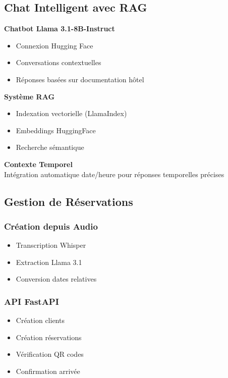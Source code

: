 \documentclass[12pt,a4paper]{article}
\newenvironment{block}[1]{\begin{center}\begin{minipage}{0.9\textwidth}\textbf{#1}\\}{\end{minipage}\end{center}}
\begin{document}
\subsection{Chat Intelligent avec RAG}

\begin{block}{Chatbot Llama 3.1-8B-Instruct}
\begin{itemize}
    \item Connexion Hugging Face
    \item Conversations contextuelles
    \item Réponses basées sur documentation hôtel
\end{itemize}
\end{block}

\begin{block}{Système RAG}
\begin{itemize}
    \item Indexation vectorielle (LlamaIndex)
    \item Embeddings HuggingFace
    \item Recherche sémantique
\end{itemize}
\end{block}

\begin{block}{Contexte Temporel}
Intégration automatique date/heure pour réponses temporelles précises
\end{block}

\subsection{Gestion de Réservations}

\subsubsection{Création depuis Audio}
\begin{itemize}
    \item Transcription Whisper
    \item Extraction Llama 3.1
    \item Conversion dates relatives
\end{itemize}

\subsubsection{API FastAPI}
\begin{itemize}
    \item Création clients
    \item Création réservations
    \item Vérification QR codes
    \item Confirmation arrivée
\end{itemize}
\end{document}
